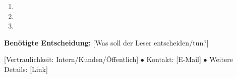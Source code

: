 \documentclass[11pt,a4paper]{article}
\begin{document}
\vspace{0.3cm}

% 
% 

\begin{tcolorbox}[colback=green!5!white, colframe=green!50!black, 
    boxrule=0.5pt, title=\textbf{Empfehlung / Next Steps}]

\begin{enumerate}[nosep]
\item [Konkrete Aktion 1]
\item [Konkrete Aktion 2]
\item [Konkrete Aktion 3]
\end{enumerate}

\textbf{Benötigte Entscheidung:} [Was soll der Leser entscheiden/tun?]

\end{tcolorbox}

\vfill
\begin{center}
\small\color{gray}
[Vertraulichkeit: Intern/Kunden/Öffentlich] $\bullet$ 
Kontakt: [E-Mail] $\bullet$
Weitere Details: [Link]
\end{center}
\end{document}
